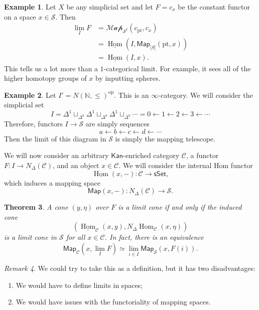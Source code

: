 \documentclass[10pt, oneside]{memoir}
\newtheorem{thm}{Theorem}[subsection]
\theoremstyle{definition}
\newtheorem{exm}[thm]{Example}
\theoremstyle{remark}
\newtheorem{rmk}[thm]{Remark}
\theoremstyle{plain}
\theoremstyle{definition}
\theoremstyle{remark}
\newcommand{\N}{\mathbb{N}}
\newcommand{\mc}[1]{\mathcal{#1}}
\newcommand{\mr}[1]{\mathrm{#1}}
\newcommand{\ms}[1]{\mathsf{#1}}
\newcommand{\ul}[1]{\underline{#1}}
\newcommand{\1}{\mathbf{1}}
\newcommand{\2}{\mathbf{2}}
\newcommand{\3}{\mathbf{3}}
\DeclareMathOperator{\Hom}{Hom}
\DeclareMathOperator{\op}{op}
\begin{document}
\begin{exm}
    Let \(X \) be any simplicial set and let \(F = c_x \) be the constant functor on a space \(x \in \mc{S} \). Then
    \begin{align*}
        \lim_I F &= \mc{Map}_{\mc{S}^I}(c_{\mr{pt}}, c_x) \\
        &= \ul{\Hom}(I, \ms{Map}_{\mc[S]}(\mr{pt}, x)) \\
        &= \ul{\Hom}(I, x).
    \end{align*}
    This tells us a lot more than a \(1 \)-categorical limit. For example, it sees all of the higher homotopy groups of \(x \) by inputting spheres.
\end{exm}

\begin{exm}
    Let \(I' = N(\N, \leq)^{\op} \). This is an \(\infty \)-category. We will consider the simplicial set
    \[ I = \Delta^1 \sqcup_{\Delta^0} \Delta^1 \sqcup_{\Delta^0} \Delta^1 \sqcup_{\Delta^0} \cdots = 0 \gets 1 \gets 2 \gets 3 \gets \cdots \]
    Therefore, functors \(I \to \mc{S} \) are simply sequences
    \[ a \gets b \gets c \gets d \gets \cdots \]
    Then the limit of this diagram in \(\mc{S} \) is simply the mapping telescope.
\end{exm}

We will now consider an arbitrary \(\ms{Kan} \)-enriched category \(\mc{C} \), a functor \(F \colon I \to N_{\Delta}(\mc{C}) \), and an object \(x \in \mc{C} \). We will consider the internal Hom functor
\[ \ul{\Hom}(x, -) \colon \mc{C} \to \ms{sSet}, \]
which induces a mapping space
\[ \ms{Map}(x, -) \colon N_{\Delta}(\mc{C}) \to \mc{S}. \]

\begin{thm}\label{thm:limitsviaspaces}
    A cone \((y, \eta) \) over \(F \) is a limit cone if and only if the induced cone
    \[ (\ul{\Hom}_{\mc{C}}(x, y), N_{\Delta} \Hom_{\mc{C}}(x, \eta)) \]
    is a limit cone in \(\mc{S} \) for all \(x \in \mc{C} \). In fact, there is an equivalence
    \[ \ms{Map}_{\mc{C}}(x, \lim_I F) \simeq \lim_{i \in I} \ms{Map}_{\mc{S}}(x, F(i)). \]
\end{thm}

\begin{rmk}
    We could try to take this as a definition, but it has two disadvantages:
    \begin{enumerate}
        \item We would have to define limits in spaces;
        \item We would have issues with the functoriality of mapping spaces.
    \end{enumerate}
\end{rmk}
\end{document}
